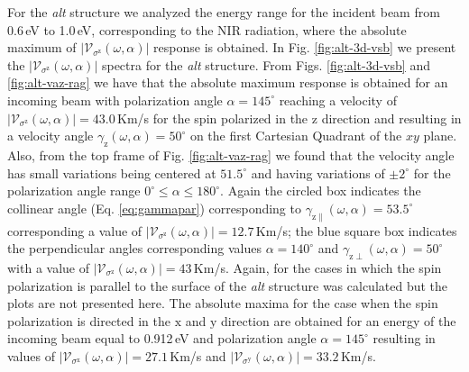 \documentclass[prb,11pt,tightenlines,twocolumn,aps]{revtex4-1}
\begin{document}
For the \emph{alt} structure we analyzed the energy range for the incident beam
from 0.6\,eV to 1.0\,eV, corresponding to the NIR radiation, where the absolute
maximum of $|\mathcal{V}_{\sigma^{\mathrm{z}}}(\omega,\alpha)|$ response is
obtained.
% 
In Fig. \ref{fig:alt-3d-vsb} we present the
$|\mathcal{V}_{\sigma^{\mathrm{z}}}(\omega,\alpha)|$ spectra for the \emph{alt}
structure.
% 
% 
From Figs. \ref{fig:alt-3d-vsb} and \ref{fig:alt-vaz-rag} we have that the
absolute maximum response is obtained for an incoming beam with polarization
angle $\alpha=145^{\circ}$ reaching a velocity of
$|\mathcal{V}_{\sigma^{\mathrm{z}}}(\omega,\alpha)| = 43.0$\,Km/s for the spin
polarized in the $\mathrm{z}$ direction and resulting in a velocity angle
$\gamma_{\mathrm{z}}(\omega,\alpha)=50^{\circ}$ on the first Cartesian Quadrant
of the $xy$ plane.
% 
Also, from the top frame of Fig. \ref{fig:alt-vaz-rag} we found that the
velocity angle has small variations being centered at $51.5^{\circ}$ and having
variations of $\pm 2^{\circ}$ for the polarization angle range $0^{\circ} \leq
\alpha \leq 180^{\circ}$.
% 
Again the circled box indicates the collinear angle (Eq.
\eqref{eq:gammapar}) corresponding to
$\gamma_{\mathrm{z}\parallel}(\omega,\alpha) = 53.5^{\circ}$ corresponding a
value of $|\mathcal{V}_{\sigma^{\mathrm{z}}}(\omega,\alpha)| = 12.7$\,Km/s; the
blue square box indicates the perpendicular angles corresponding values
$\alpha=140^{\circ}$ and $\gamma_{\mathrm{z}\perp}(\omega,\alpha)=50^{\circ}$
with a value of $|\mathcal{V}_{\sigma^{\mathrm{z}}}(\omega,\alpha)|=43$\,Km/s.
% 
Again, for the cases in which the spin polarization is parallel to the surface
of the \emph{alt} structure was calculated but the plots are not presented here.
The absolute maxima for the case when the spin polarization is directed in the
$\mathrm{x}$ and $\mathrm{y}$ direction are obtained for an energy of the
incoming beam equal to 0.912\,eV and polarization angle $\alpha=145^{\circ}$
resulting in values of
$|\mathcal{V}_{\sigma^{\mathrm{x}}}(\omega,\alpha)|=27.1$\,Km/s and
$|\mathcal{V}_{\sigma^{\mathrm{y}}}(\omega,\alpha)|=33.2$\,Km/s.
\end{document}
